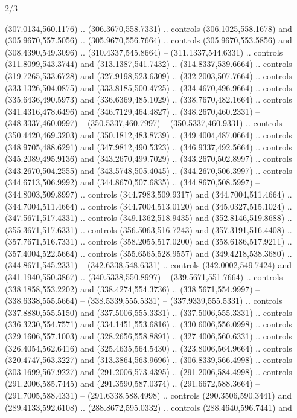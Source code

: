 \begin{flagdescription}{2/3}
\begin{scope}[xshift=0.5\flaglength,yshift=0.5\flagwidth,scale=\flagwidth/525.28]
\begin{scope}[y=0.1mm, x=0.1mm, yscale=-1,shift={(-381.5,-404)}]
\begin{scope}[shift={(5.25001,4.53053)},miter limit=4.00,line width=0.800\lw]
  (307.0134,560.1176) .. (306.3670,558.7331) .. controls (306.1025,558.1678) and
  (305.9670,557.5056) .. (305.9670,556.7664) .. controls (305.9670,553.5856) and
  (308.4390,549.3096) .. (310.4337,545.8664) -- (311.1337,544.6331) .. controls
  (311.8099,543.3744) and (313.1387,541.7432) .. (314.8337,539.6664) .. controls
  (319.7265,533.6728) and (327.9198,523.6309) .. (332.2003,507.7664) .. controls
  (333.1326,504.0875) and (333.8185,500.4725) .. (334.4670,496.9664) .. controls
  (335.6436,490.5973) and (336.6369,485.1029) .. (338.7670,482.1664) .. controls
  (341.4316,478.6496) and (346.7129,464.4827) .. (348.2670,460.2331) --
  (348.3337,460.0997) -- (350.5337,460.7997) -- (350.5337,460.9331) .. controls
  (350.4420,469.3203) and (350.1812,483.8739) .. (349.4004,487.0664) .. controls
  (348.9705,488.6291) and (347.9812,490.5323) .. (346.9337,492.5664) .. controls
  (345.2089,495.9136) and (343.2670,499.7029) .. (343.2670,502.8997) .. controls
  (343.2670,504.2555) and (343.5748,505.4045) .. (344.2670,506.3997) .. controls
  (344.6713,506.9992) and (344.8670,507.6835) .. (344.8670,508.5997) --
  (344.8003,509.8997) .. controls (344.7983,509.9317) and (344.7004,511.4664) ..
  (344.7004,511.4664) .. controls (344.7004,513.0120) and (345.0327,515.1024) ..
  (347.5671,517.4331) .. controls (349.1362,518.9435) and (352.8146,519.8688) ..
  (355.3671,517.6331) .. controls (356.5063,516.7243) and (357.3191,516.4408) ..
  (357.7671,516.7331) .. controls (358.2055,517.0200) and (358.6186,517.9211) ..
  (357.4004,522.5664) .. controls (355.6565,528.9557) and (349.4218,538.3680) ..
  (344.8671,545.2331) -- (342.6338,548.6331) .. controls (342.0002,549.7424) and
  (341.1940,550.3867) .. (340.5338,550.8997) -- (339.5671,551.7664) .. controls
  (338.1858,553.2202) and (338.4274,554.3736) .. (338.5671,554.9997) --
  (338.6338,555.5664) -- (338.5339,555.5331) -- (337.9339,555.5331) .. controls
  (337.8880,555.5150) and (337.5006,555.3331) .. (337.5006,555.3331) .. controls
  (336.3230,554.7571) and (334.1451,553.6816) .. (330.6006,556.0998) .. controls
  (329.1606,557.1003) and (328.2656,558.8891) .. (327.4006,560.6331) .. controls
  (326.4054,562.6416) and (325.4635,564.5430) .. (323.8006,564.9664) .. controls
  (320.4747,563.3227) and (313.3864,563.9696) .. (306.8339,566.4998) .. controls
  (303.1699,567.9227) and (291.2006,573.4395) .. (291.2006,584.4998) .. controls
  (291.2006,585.7445) and (291.3590,587.0374) .. (291.6672,588.3664) --
  (291.7005,588.4331) -- (291.6338,588.4998) .. controls (290.3506,590.3441) and
  (289.4133,592.6108) .. (288.8672,595.0332) .. controls (288.4640,596.7441) and

\end{scope}
\end{scope}
\end{scope}
\end{flagdescription}
